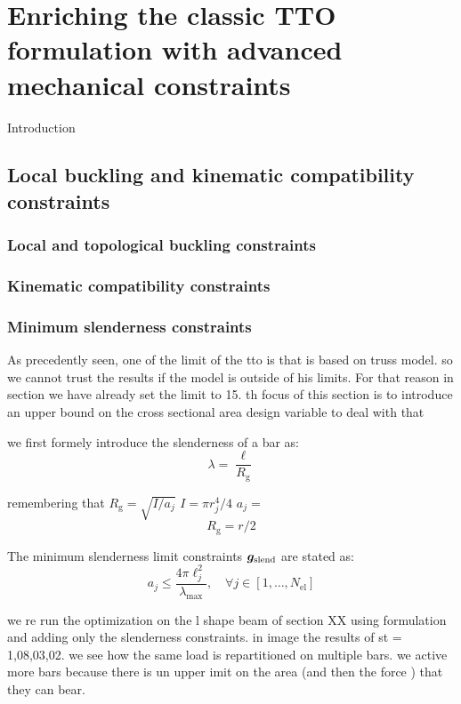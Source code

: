 \setchapterpreamble[u]{\margintoc}
\chapter{Enriching the classic TTO formulation with advanced mechanical constraints}
Introduction
\section{Local buckling and kinematic compatibility constraints}

\subsection{Local and topological buckling constraints}

\subsection{Kinematic compatibility constraints}

\subsection{Minimum slenderness constraints}
As precedently seen, one of the limit of the tto is that is based on truss model. so we cannot trust the results if the model is outside of his limits. For that reason in section we have already set the limit to 15. th focus of this section is to introduce an upper bound on the cross sectional area design variable to deal with that

we first formely introduce the slenderness of a bar as:
\begin{equation}
    \lambda = \frac{\ell}{R_{\mathrm{g}}}
\end{equation}

remembering that
$R_{\mathrm{g}} = \sqrt{I/a_j}$ $I = \pi r_j^4/4$ 
$a_j=$
\begin{equation}
    R_{\mathrm{g}} = r/2
\end{equation}

The minimum slenderness limit constraints $\bm{g}_{\text{slend}}$ are stated as:
\begin{equation}
    a_j \leq \frac{4 \pi \ell_j^2}{\lambda_{\text{max}}}, \quad \forall j \in [1,\ldots, N_{\text{el}}]
\end{equation}

we re run the optimization on the l shape beam of section XX using formulation and adding only the slenderness constraints. in image the results of st = 1,08,03,02. we see how the same load is repartitioned on multiple bars. we active more bars because there is un upper imit on the area (and then the force ) that they can bear.

